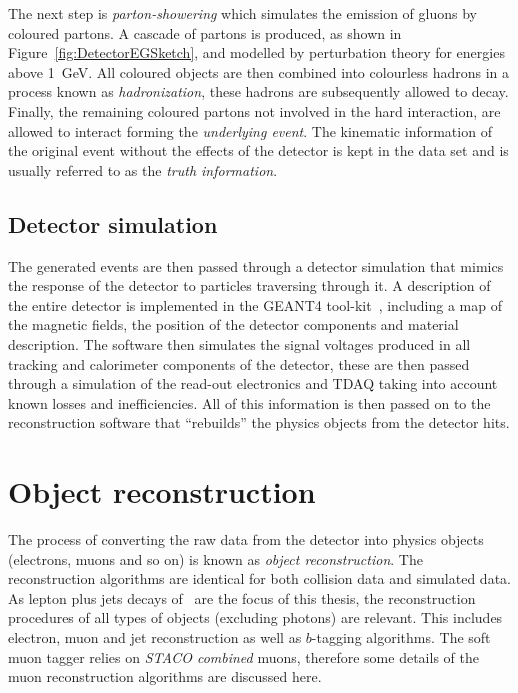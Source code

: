 The next step is \emph{parton-showering} which simulates the emission of gluons by coloured partons. A cascade of partons is produced, as shown in Figure~\ref{fig:DetectorEGSketch}, and modelled by perturbation theory for energies above \SI{1}{GeV}. All coloured objects are then combined into colourless hadrons in a process known as \emph{hadronization}, these hadrons are subsequently allowed to decay. Finally, the remaining coloured partons not involved in the hard interaction, are allowed to interact forming the \emph{underlying event}. The kinematic information of the original event without the effects of the detector is kept in the data set and is usually referred to as the \emph{truth information}.

\subsection{Detector simulation} \label{sec:DetectorSimulation}

The generated events are then passed through a detector simulation that mimics the response of the detector to particles traversing through it. A description of the entire detector is implemented in the GEANT4 tool-kit~\cite{Detector:Geant4}, including a map of the magnetic fields, the position of the detector components and material description. The software then simulates the signal voltages produced in all tracking and calorimeter components of the detector, these are then passed through a simulation of the read-out electronics and TDAQ taking into account known losses and inefficiencies. All of this information is then passed on to the reconstruction software that ``rebuilds'' the physics objects from the detector hits.

\section{Object reconstruction} \label{sec:DetectorEventReco}

The process of converting the raw data from the detector into physics objects (electrons, muons and so on) is known as \emph{object reconstruction}. The reconstruction algorithms are identical for both collision data and simulated data. As lepton plus jets decays of \ttbar\ are the focus of this thesis, the reconstruction procedures of all types of objects (excluding photons) are relevant. This includes electron, muon and jet reconstruction as well as $b$-tagging algorithms. The soft muon tagger relies on \emph{STACO combined} muons, therefore some details of the muon reconstruction algorithms are discussed here.


